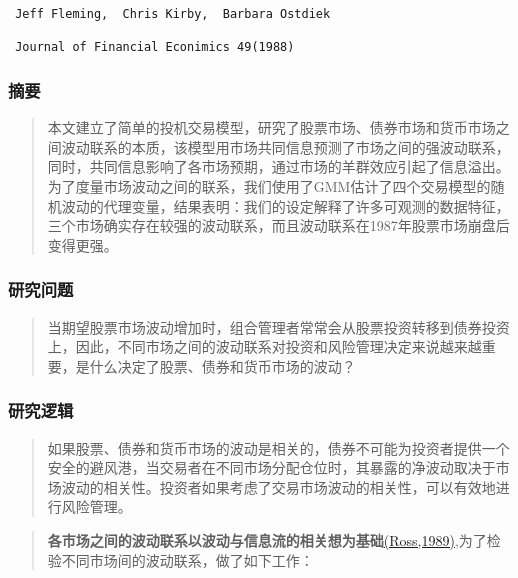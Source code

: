 \documentclass[
]{article}
\begin{document}
\begin{verbatim}
 Jeff Fleming,  Chris Kirby,  Barbara Ostdiek
 
 Journal of Financial Econimics 49(1988)
\end{verbatim}

\hypertarget{ux6458ux8981-1}{%
\subsubsection{摘要}\label{ux6458ux8981-1}}

\begin{quote}
本文建立了简单的投机交易模型，研究了股票市场、债券市场和货币市场之间波动联系的本质，该模型用市场共同信息预测了市场之间的强波动联系，同时，共同信息影响了各市场预期，通过市场的羊群效应引起了信息溢出。为了度量市场波动之间的联系，我们使用了GMM估计了四个交易模型的随机波动的代理变量，结果表明：我们的设定解释了许多可观测的数据特征，三个市场确实存在较强的波动联系，而且波动联系在1987年股票市场崩盘后变得更强。
\end{quote}

\hypertarget{ux7814ux7a76ux95eeux9898-1}{%
\subsubsection{研究问题}\label{ux7814ux7a76ux95eeux9898-1}}

\begin{quote}
当期望股票市场波动增加时，组合管理者常常会从股票投资转移到债券投资上，因此，不同市场之间的波动联系对投资和风险管理决定来说越来越重要，是什么决定了股票、债券和货币市场的波动？
\end{quote}

\hypertarget{ux7814ux7a76ux903bux8f91-1}{%
\subsubsection{研究逻辑}\label{ux7814ux7a76ux903bux8f91-1}}

\begin{quote}
如果股票、债券和货币市场的波动是相关的，债券不可能为投资者提供一个安全的避风港，当交易者在不同市场分配仓位时，其暴露的净波动取决于市场波动的相关性。投资者如果考虑了交易市场波动的相关性，可以有效地进行风险管理。
\end{quote}

\begin{quote}
\textbf{各市场之间的波动联系以波动与信息流的相关想为基础}\href{https://doi.org/10.1111/j.1540-6261.1989.tb02401.x}{(Ross,1989)},为了检验不同市场间的波动联系，做了如下工作：
\end{quote}
\end{document}
